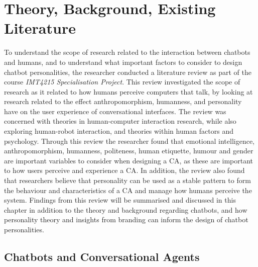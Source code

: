 \chapter{Theory, Background, Existing Literature}
\label{chap:background}


To understand the scope of research related to the interaction between chatbots and humans, and to understand what important factors to consider to design chatbot personalities, the researcher conducted a literature review as part of the course \textit{IMT4215 Specialisation Project}. This review investigated the scope of research as it related to how humans perceive computers that talk, by looking at research related to the effect anthropomorphism, humanness, and personality have on the user experience of conversational interfaces. The review was concerned with theories in human-computer interaction research, while also exploring human-robot interaction, and theories within human factors and psychology. Through this review the researcher found that emotional intelligence, anthropomorphism, humanness, politeness, human etiquette, humour and gender are important variables to consider when designing a CA, as these are important to how users perceive and experience a CA. In addition, the review also found that researchers \citep{callejas2011,Xiao2005,McTear2016a} believe that personality can be used as a stable pattern to form the behaviour and characteristics of a CA and manage how humans perceive the system. Findings from this review will be summarised and discussed in this chapter in addition to the theory and background regarding chatbots, and how personality theory and insights from branding can inform the design of chatbot personalities.

\vspace{5mm} %

\section{Chatbots and Conversational Agents}

